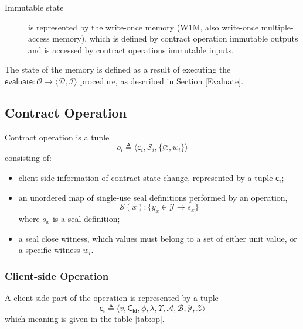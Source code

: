 \documentclass[9pt,oneside]{amsart}
\begin{document}
\begin{multicols}{2}
\begin{description}
\item[Immutable state] is represented by the \gls{write-once memory}
  (W1M, also write-once multiple-access memory),
  which is defined by contract operation immutable outputs
  and is accessed by contract operations immutable inputs.
\end{description}

The state of the memory is defined as a result of executing the
$\mathsf{evaluate}: \mathcal{O} \rightarrow \langle \mathcal{D}, \mathcal{I} \rangle$ procedure,
as described in Section \ref{Evaluate}.

\subsection{Contract Operation}\label{Operation}

Contract operation is a tuple
\begin{equation}\label{eq:op}
o_i \triangleq \big\langle \mathsf{c}_i, \mathcal{S}_i, \{ \varnothing, w_i \} \big\rangle
\end{equation}
\noindent
consisting of:
\noindent
\begin{itemize}
\item client-side information of contract state change, represented by a tuple $\mathsf{c}_i$;
\item an unordered map of single-use seal definitions performed by an operation,
\noindent
\begin{equation}\label{eq:seals}
  \mathcal{S}(x): \{ y_x \in \mathcal{Y} \rightarrow s_x \}
  \end{equation}
\noindent
where $s_x$ is a seal definition;
\item a \gls{seal close witness},
which values must belong to a set of either unit value, or a specific witness $w_i$.
\end{itemize}

\subsubsection{Client-side Operation}

A client-side part of the operation is represented by a tuple
\noindent
\begin{equation}
\mathsf{c}_i \triangleq \langle v, \mathsf{C_{Id}}, \phi, \lambda, \Upsilon, \mathcal{A}, \mathcal{B}, \mathcal{Y}, \mathcal{Z} \rangle
\end{equation}
\noindent
which meaning is given in the table \ref{tab:op}.


\end{multicols}
\end{document}
